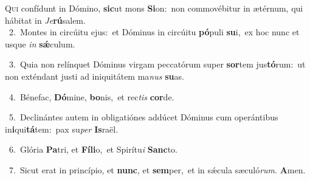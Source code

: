 \lettrine{\initial\textcolor{\initialcolor}{Q}}{ui} confídunt in Dómino, \textbf{sic}\-ut mons \textbf{Si}\-on:~\star non commovébitur in ætérnum, qui hábitat in \textit{Je}\-\textbf{rú}salem.\\
{\numbfont\textcolor{\numbcolor}{~2.}}~Montes in circúitu ejus:~\dagger et Dóminus in circúitu \textbf{pó}\-puli \textbf{su}\-i,~\star ex hoc nunc et usque \textit{in} \textbf{sǽ}\-culum.\par
{\numbfont\textcolor{\numbcolor}{~3.}}~Quia non relínquet Dóminus virgam peccatórum super \textbf{sor}\-tem jus\-\textbf{tó}\-rum:~\star ut non exténdant justi ad iniquitátem ma\textit{nus} \textbf{su}\-as.\par
{\numbfont\textcolor{\numbcolor}{~4.}}~Bénefac, \textbf{Dó}\-mine, \textbf{bo}\-nis,~\star et rec\textit{tis} \textbf{cor}\-de.\par
{\numbfont\textcolor{\numbcolor}{~5.}}~Declinántes autem in obligatiónes addúcet Dóminus cum operántibus in\-\textbf{i}\-qui\-\textbf{tá}\-tem:~\star pax su\textit{per} \textbf{Is}\-raël.\par
{\numbfont\textcolor{\numbcolor}{~6.}}~Glória \textbf{Pa}\-tri, et \textbf{Fí}\-\textbf{li}o,~\star et Spirítu\textit{i} \textbf{Sanc}\-to.\par
{\numbfont\textcolor{\numbcolor}{~7.}}~Sicut erat in princípio, et \textbf{nunc}\-, et \textbf{sem}\-per,~\star et in sǽcula sæculó\-\textit{rum}\-. \textbf{A}\-men.\par
